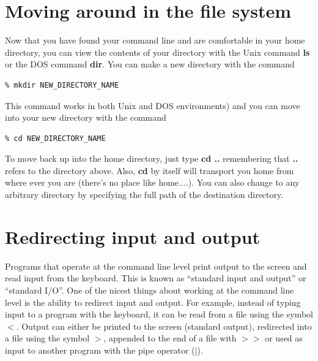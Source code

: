\documentclass[11pt]{book}
\begin{document}
{{
\section{Moving around in the file system}

Now that you have found your command line and are comfortable in your home directory, you can view the contents of your directory with the Unix command {\bf ls} or the DOS command {\bf dir}.
You can make a new directory with the command
\begin{verbatim}
% mkdir NEW_DIRECTORY_NAME
\end{verbatim}
This command works in both Unix and DOS environments) and you can move into your new directory with the command
\begin{verbatim}
% cd NEW_DIRECTORY_NAME
\end{verbatim}
   To move back up into the home directory, just type {\bf cd ..} remembering that {\bf ..} refers to the directory above.  Also, {\bf cd} by itself will transport you home from where ever you are (there's no place like home....).     You can also change to any arbitrary directory by specifying the full path of the destination directory.


%
%


\section {Redirecting input and output}

Programs that operate at the command line level print output to the screen and read input
from the keyboard. This is
known as ``standard input and output'' or ``standard I/O''.
One of the nicest things about working at the command line level is the ability to redirect input and output.
For example, instead of typing input to a program with the keyboard, it can
be read from a file using the symbol {\bf $<$}.   Output can either be printed to the screen (standard output), redirected into a file using the symbol {\bf $>$}, appended to the end of a file with {\bf $>>$} or
used as input to another program with the pipe operator ({\bf$ |$}).

}}
\end{document}
